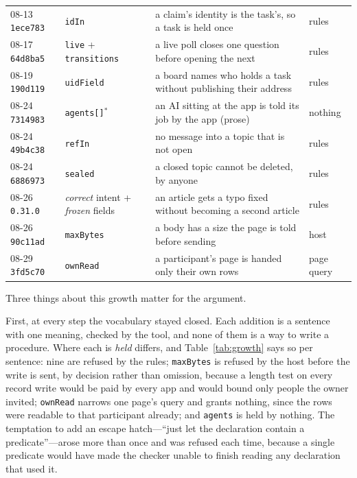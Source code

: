 \documentclass[11pt]{article}
\begin{document}
\begin{table}[tb]
\begin{tabular}{@{}llp{6.4cm}l@{}}
08-13 \texttt{1ece783} & \texttt{idIn} & a claim's identity is the task's, so a task is held once & rules \\
08-17 \texttt{64d8ba5} & \texttt{live} + \texttt{transitions} & a live poll closes one question before opening the next & rules \\
08-19 \texttt{190d119} & \texttt{uidField} & a board names who holds a task without publishing their address & rules \\
08-24 \texttt{7314983} & \texttt{agents[]}$^{*}$ & an AI sitting at the app is told its job by the app (prose) & nothing \\
08-24 \texttt{49b4c38} & \texttt{refIn} & no message into a topic that is not open & rules \\
08-24 \texttt{6886973} & \texttt{sealed} & a closed topic cannot be deleted, by anyone & rules \\
08-26 \texttt{0.31.0} & \emph{correct} intent + \emph{frozen} fields & an article gets a typo fixed without becoming a second article & rules \\
08-26 \texttt{90c11ad} & \texttt{maxBytes} & a body has a size the page is told before sending & host \\
08-29 \texttt{3fd5c70} & \texttt{ownRead} & a participant's page is handed only their own rows & page query \\
\bottomrule
\end{tabular}
\end{table}

Three things about this growth matter for the argument.

First, at every step the vocabulary stayed closed. Each addition is a sentence with one meaning, checked by the tool, and none of them is a way to write a procedure. Where each is \emph{held} differs, and Table~\ref{tab:growth} says so per sentence: nine are refused by the rules; \texttt{maxBytes} is refused by the host before the write is sent, by decision rather than omission, because a length test on every record write would be paid by every app and would bound only people the owner invited; \texttt{ownRead} narrows one page's query and grants nothing, since the rows were readable to that participant already; and \texttt{agents} is held by nothing. The temptation to add an escape hatch---``just let the declaration contain a predicate''---arose more than once and was refused each time, because a single predicate would have made the checker unable to finish reading any declaration that used it.
\end{document}
